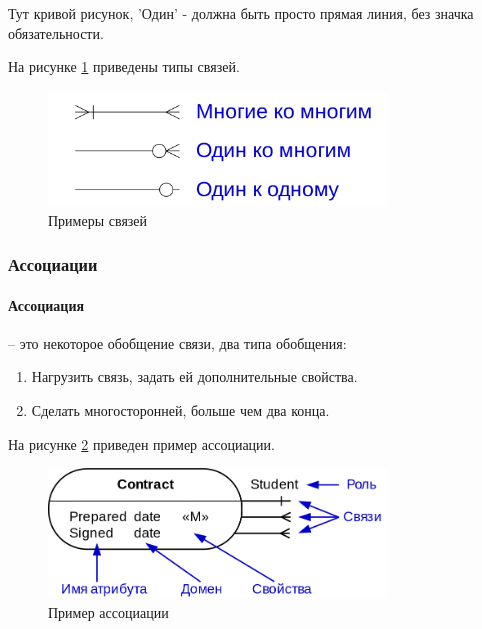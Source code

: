 \begin{remark}
	Тут кривой рисунок, 'Один' - должна быть просто прямая линия, без значка обязательности.
\end{remark}

На рисунке \ref{ref-types} приведены типы связей.

\begin{figure}[h]
	\centering
	\includegraphics[width=0.8\textwidth]{../assets/kgeorgiy/modelling/ERModel_RelationshipTypes.svg.png}
	\caption{Примеры связей}
	\label{ref-types}
\end{figure}

\subsubsection{Ассоциации}

\paragraph{Ассоциация} -- это некоторое обобщение связи, два типа обобщения:
\begin{enumerate}
	\item Нагрузить связь, задать ей дополнительные свойства.
	\item Сделать многосторонней, больше чем два конца.
\end{enumerate}

На рисунке \ref{assoc-ex} приведен пример ассоциации.

\begin{figure}[h]
	\centering
	\includegraphics[width=0.8\textwidth]{../assets/kgeorgiy/modelling/ERModel_Association.svg.png}
	\caption{Пример ассоциации}
	\label{assoc-ex}
\end{figure}

